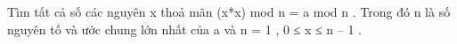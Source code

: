 Tìm tất cả số các nguyên x thoả mãn (x*x) mod n = a mod n . Trong đó n là số nguyên tố và ước chung lớn nhất của a và n = 1 , 0 ≤ x ≤ n – 1 .